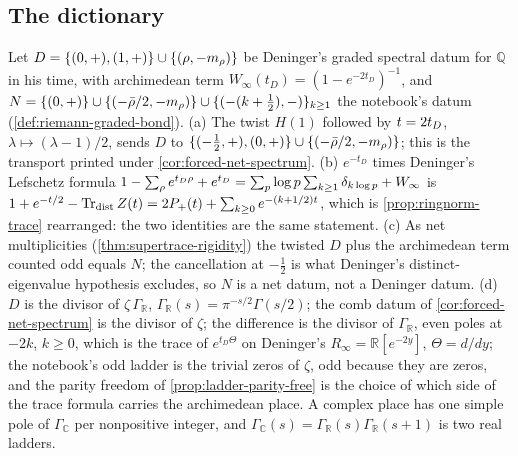 \subsection{The dictionary}

\begin{proposition}
\label{prop:deninger-twist-identity}
Let $D = \{(0,+),(1,+)\}\cup\{(\rho,-m_\rho)\}$ be Deninger's graded spectral datum for $\mathbb Q$ in his time,
with archimedean term $W_\infty(t_D) = (1-e^{-2t_D})^{-1}$, and $N = \{(0,+)\}\cup\{(-\bar{\rho}/2,-m_\rho)\}\cup
\{(-(k+\tfrac12),-)\}_{k\ge1}$ the notebook's datum (\cref{def:riemann-graded-bond}). (a) The twist $H(1)$ followed
by $t = 2t_D$, $\lambda\mapsto(\lambda-1)/2$, sends $D$ to $\{(-\tfrac12,+),(0,+)\}\cup\{(-\bar{\rho}/2,-m_\rho)\}$;
this is the transport printed under \cref{cor:forced-net-spectrum}. (b) $e^{-t_D}$ times Deninger's Lefschetz
formula $1-\sum_\rho e^{t_D\rho}+e^{t_D} = \sum_p\log p\sum_{k\ge1}\delta_{k\log p}+W_\infty$ is
$1+e^{-t/2}-\operatorname{Tr}_{\mathrm{dist}}Z(t) = 2P_{+}(t)+\sum_{k\ge0}e^{-(k+1/2)t}$, which is \cref{prop:ringnorm-trace}
rearranged: the two identities are the same statement. (c) As net multiplicities
(\cref{thm:supertrace-rigidity}) the twisted $D$ plus the archimedean term counted odd equals $N$; the
cancellation at $-\tfrac12$ is what Deninger's distinct-eigenvalue hypothesis excludes, so $N$ is a net datum,
not a Deninger datum. (d) $D$ is the divisor of $\zeta\,\Gamma_{\mathbb R}$, $\Gamma_{\mathbb R}(s) =
\pi^{-s/2}\Gamma(s/2)$; the comb datum of \cref{cor:forced-net-spectrum} is the divisor of $\zeta$; the difference is
the divisor of $\Gamma_{\mathbb R}$, even poles at $-2k$, $k\ge0$, which is the trace of $e^{t_D\Theta}$ on Deninger's
$R_\infty = \mathbb R[e^{-2y}]$, $\Theta = d/dy$; the notebook's odd ladder is the trivial zeros of $\zeta$, odd
because they are zeros, and the parity freedom of \cref{prop:ladder-parity-free} is the choice of which side of
the trace formula carries the archimedean place. A complex place has one simple pole of $\Gamma_{\mathbb C}$ per
nonpositive integer, and $\Gamma_{\mathbb C}(s) = \Gamma_{\mathbb R}(s)\Gamma_{\mathbb R}(s+1)$ is two real ladders.
\end{proposition}

